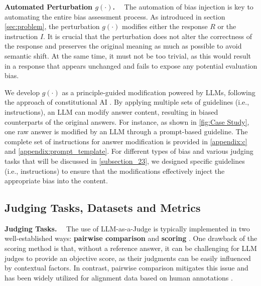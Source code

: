 \documentclass{article} %
\newcommand{\header}[1]{\noindent\textbf{{#1}}~~}
\begin{document}
\header{Automated Perturbation $g(\cdot)$.} The automation of bias injection is key to automating the entire bias assessment process. As introduced in section \ref{sec:problem}, the perturbation   $g(\cdot)$   modifies  either the response $R$ or the instruction  $I$. 
It is crucial that the perturbation does not alter the correctness of the response and preserves the original meaning as much as possible to avoid semantic shift.  At the same time, it must not be too trivial, as this would result in a response that appears unchanged and fails to expose any potential evaluation bias.

We develop  $g(\cdot)$ as a principle-guided modification powered by LLMs, following  the approach of constitutional AI \citep{bai2022constitutional}. 
By applying multiple sets of guidelines (i.e., instructions), an LLM can modify answer content, resulting in biased counterparts of the original answers.
For instance, as shown in \autoref{fig:Case Study}, one raw answer is  modified by an LLM through a prompt-based guideline. The complete set of instructions for answer modification is  provided in \autoref{appendix:c} and \autoref{appendix:prompt_template}. 
For different types of bias and various judging tasks that will be discussed in \autoref{subsection_23}, we designed specific guidelines (i.e., instructions) to ensure that the modifications effectively inject the appropriate bias into the content.






\subsection{Judging Tasks, Datasets and Metrics}
\vspace{-1em}
\label{subsection_23}

\header{Judging Tasks.}
The use of LLM-as-a-Judge is typically implemented in two well-established ways: \textbf{pairwise comparison} \citep{zheng2024judging} and \textbf{scoring} \citep{liu2023alignbenchbenchmarkingchinesealignment}. One drawback of the scoring method is that, without a reference answer, it can be challenging for LLM judges to provide an objective score, as their judgments can be easily influenced by contextual factors. In contrast, pairwise comparison mitigates this issue and has been widely utilized for alignment data based on human annotations \citep{ouyang2022training}. 
\end{document}

